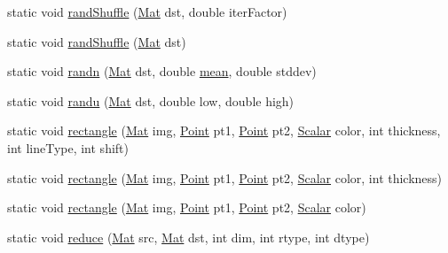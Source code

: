 \begin{DoxyCompactItemize}
\item 
static void \mbox{\hyperlink{classorg_1_1opencv_1_1core_1_1_core_ab80ad04c349aee7d887830ec8de84ae2}{rand\+Shuffle}} (\mbox{\hyperlink{classorg_1_1opencv_1_1core_1_1_mat}{Mat}} dst, double iter\+Factor)
\item 
static void \mbox{\hyperlink{classorg_1_1opencv_1_1core_1_1_core_ac1698bb3fd0c489839e5dd5eccfe5260}{rand\+Shuffle}} (\mbox{\hyperlink{classorg_1_1opencv_1_1core_1_1_mat}{Mat}} dst)
\item 
static void \mbox{\hyperlink{classorg_1_1opencv_1_1core_1_1_core_adc06c7d15abcade8d369a20bab2d7355}{randn}} (\mbox{\hyperlink{classorg_1_1opencv_1_1core_1_1_mat}{Mat}} dst, double \mbox{\hyperlink{classorg_1_1opencv_1_1core_1_1_core_aff700e66b1cef1a74cfd94d405369edf}{mean}}, double stddev)
\item 
static void \mbox{\hyperlink{classorg_1_1opencv_1_1core_1_1_core_abfe7d53276a89fcf1a78b744cd75b9fc}{randu}} (\mbox{\hyperlink{classorg_1_1opencv_1_1core_1_1_mat}{Mat}} dst, double low, double high)
\item 
static void \mbox{\hyperlink{classorg_1_1opencv_1_1core_1_1_core_a3d2d8fc68149238f6b3d7c0d6e70066a}{rectangle}} (\mbox{\hyperlink{classorg_1_1opencv_1_1core_1_1_mat}{Mat}} img, \mbox{\hyperlink{classorg_1_1opencv_1_1core_1_1_point}{Point}} pt1, \mbox{\hyperlink{classorg_1_1opencv_1_1core_1_1_point}{Point}} pt2, \mbox{\hyperlink{classorg_1_1opencv_1_1core_1_1_scalar}{Scalar}} color, int thickness, int line\+Type, int shift)
\item 
static void \mbox{\hyperlink{classorg_1_1opencv_1_1core_1_1_core_a713e32fc1ab8efed4d38172dc3731627}{rectangle}} (\mbox{\hyperlink{classorg_1_1opencv_1_1core_1_1_mat}{Mat}} img, \mbox{\hyperlink{classorg_1_1opencv_1_1core_1_1_point}{Point}} pt1, \mbox{\hyperlink{classorg_1_1opencv_1_1core_1_1_point}{Point}} pt2, \mbox{\hyperlink{classorg_1_1opencv_1_1core_1_1_scalar}{Scalar}} color, int thickness)
\item 
static void \mbox{\hyperlink{classorg_1_1opencv_1_1core_1_1_core_a867d653e8edc48f1c36ef0b44fdfbc2e}{rectangle}} (\mbox{\hyperlink{classorg_1_1opencv_1_1core_1_1_mat}{Mat}} img, \mbox{\hyperlink{classorg_1_1opencv_1_1core_1_1_point}{Point}} pt1, \mbox{\hyperlink{classorg_1_1opencv_1_1core_1_1_point}{Point}} pt2, \mbox{\hyperlink{classorg_1_1opencv_1_1core_1_1_scalar}{Scalar}} color)
\item 
static void \mbox{\hyperlink{classorg_1_1opencv_1_1core_1_1_core_a1849fb31954ac7655a174184f2eba671}{reduce}} (\mbox{\hyperlink{classorg_1_1opencv_1_1core_1_1_mat}{Mat}} src, \mbox{\hyperlink{classorg_1_1opencv_1_1core_1_1_mat}{Mat}} dst, int dim, int rtype, int dtype)

\end{DoxyCompactItemize}

